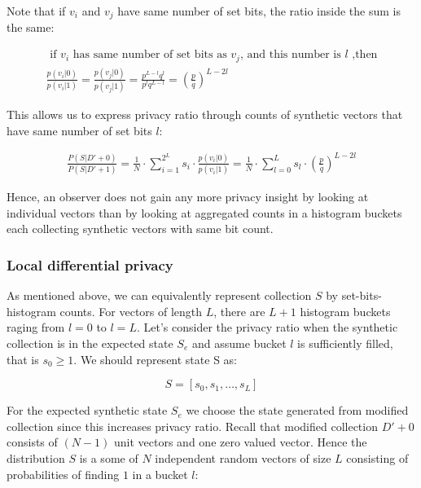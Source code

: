 \documentclass[11pt,draft]{article}
\begin{document}
Note that if $v_i$ and $v_j$ have same number of set bits, the ratio inside the sum is the same:

\begin{align}
\text { if } v_i \text { has same number of set bits as } v_j \text{, and this number is  } l \text{ ,then}  \\
\frac{p(v_i|0)}{p(v_i|1)}  = \frac{p(v_j|0)}{p(v_j|1)} = \frac{p^{L-l}q^l }{p^lq^{L-l}} = \left ( \frac{p}{q} \right )^ {L - 2l}
\end{align}

This allows us to express privacy ratio through counts of synthetic vectors that have same number of set bits $l$:

\begin{align}
\frac{P(S|D'+0)}{P(S|D'+1)} = \frac{1}{N}  \cdot  \sum_{i=1}^{2^L} s_i  \cdot \frac{p(v_i|0)}{p(v_i|1)}  =  \frac{1}{N}   \cdot  \sum_{l=0}^{L} s_l \cdot  \left ( \frac{p}{q} \right )^ {L - 2l}
\end{align}

Hence, an observer does not gain any more privacy insight by looking at individual vectors than by looking at aggregated counts in a histogram buckets each collecting synthetic vectors with same bit count. 

\subsubsection{Local differential privacy}

As mentioned above, we can equivalently represent collection $S$ by set-bits-histogram counts. For vectors of length $L$, there are $L+1$ histogram buckets raging from $l=0$ to $l=L$. 
Let's consider the privacy ratio when the synthetic collection is in the expected state $S_e$ and assume bucket $l$ is sufficiently filled, that is $s_0 \ge 1$.  We should represent state S as:

\[ S = [s_0, s_1, \dots, s_L] \]

For the expected synthetic state $S_e$ we choose the state generated from modified collection since this increases privacy ratio. Recall that modified collection $D' + 0$ consists of $(N-1)$ unit vectors and one zero valued vector.  Hence the distribution $S$ is a some of $N$ independent random vectors of size $L$ consisting of probabilities of finding $1$ in a bucket $l$:
\end{document}
